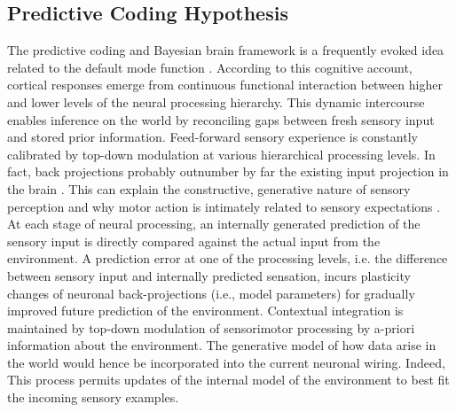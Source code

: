 \documentclass{article} %
\begin{document}
\subsection{Predictive Coding Hypothesis}
The predictive coding and Bayesian brain framework
is a frequently evoked idea related to the default mode function
\citep{bar2007}.
According to this cognitive account,
cortical responses emerge from continuous functional interaction between
higher and lower levels of the neural processing hierarchy.
This dynamic intercourse enables inference on the world by reconciling
gaps between fresh sensory input and stored prior information.
Feed-forward sensory experience is constantly calibrated by
top-down modulation at various hierarchical processing levels.
In fact,
back projections probably outnumber by far the existing input projection in the brain
\citep{salin1995corticocortical}.
This can explain the constructive, generative nature of sensory perception
\citep{friston2010free} and
why motor action is intimately related to sensory expectations
\citep{wolpert1995internal, kording2004bayesian}.
At each stage of neural processing,
an internally generated prediction of the sensory input is
directly compared against the actual input from the environment.
A prediction error at one of the processing levels,
i.e. the difference between sensory input
and internally predicted sensation,
incurs plasticity changes of neuronal back-projections (i.e., model parameters)
for gradually improved future prediction of the environment.
Contextual integration is maintained by top-down modulation of sensorimotor
processing by a-priori information about the environment.
The generative model of how data arise in the
world would hence be incorporated into
the current neuronal wiring.
Indeed,
This process permits updates of the internal model of the environment
to best fit the incoming sensory examples.
\end{document}
